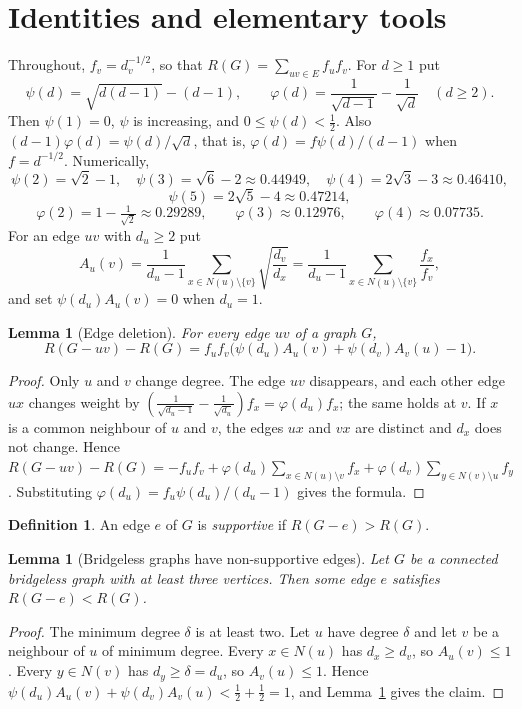 \documentclass[11pt,a4paper]{article}
\newtheorem{lemma}[theorem]{Lemma}
\theoremstyle{definition}
\newtheorem{definition}[theorem]{Definition}
\begin{document}
\section{Identities and elementary tools}\label{sec:tools}

Throughout, $f_v=d_v^{-1/2}$, so that $R(G)=\sum_{uv\in E}f_uf_v$. For $d\ge1$ put
\[
\psi(d)=\sqrt{d(d-1)}-(d-1),\qquad \varphi(d)=\frac1{\sqrt{d-1}}-\frac1{\sqrt d}\quad(d\ge2).
\]
Then $\psi(1)=0$, $\psi$ is increasing, and $0\le\psi(d)<\frac12$. Also $(d-1)\varphi(d)=\psi(d)/\sqrt d$, that is, $\varphi(d)=f\psi(d)/(d-1)$ when $f=d^{-1/2}$. Numerically,
\[
\psi(2)=\sqrt2-1,\quad \psi(3)=\sqrt6-2\approx0.44949,\quad\psi(4)=2\sqrt3-3\approx0.46410,
\]
\[
\psi(5)=2\sqrt5-4\approx0.47214,
\]
\[
\varphi(2)=1-\tfrac1{\sqrt2}\approx0.29289,\qquad\varphi(3)\approx0.12976,\qquad\varphi(4)\approx0.07735 .
\]
For an edge $uv$ with $d_u\ge2$ put
\[
A_u(v)=\frac1{d_u-1}\sum_{x\in N(u)\setminus\{v\}}\sqrt{\frac{d_v}{d_x}}=\frac1{d_u-1}\sum_{x\in N(u)\setminus\{v\}}\frac{f_x}{f_v},
\]
and set $\psi(d_u)A_u(v)=0$ when $d_u=1$.

\begin{lemma}[Edge deletion]\label{lem:edge}
For every edge $uv$ of a graph $G$,
\[
R(G-uv)-R(G)=f_uf_v\bigl(\psi(d_u)A_u(v)+\psi(d_v)A_v(u)-1\bigr).
\]
\end{lemma}
\begin{proof}
Only $u$ and $v$ change degree. The edge $uv$ disappears, and each other edge $ux$ changes weight by $(\frac1{\sqrt{d_u-1}}-\frac1{\sqrt{d_u}})f_x=\varphi(d_u)f_x$; the same holds at $v$. If $x$ is a common neighbour of $u$ and $v$, the edges $ux$ and $vx$ are distinct and $d_x$ does not change. Hence $R(G-uv)-R(G)=-f_uf_v+\varphi(d_u)\sum_{x\in N(u)\setminus v}f_x+\varphi(d_v)\sum_{y\in N(v)\setminus u}f_y$. Substituting $\varphi(d_u)=f_u\psi(d_u)/(d_u-1)$ gives the formula.
\end{proof}

\begin{definition}
An edge $e$ of $G$ is \emph{supportive} if $R(G-e)>R(G)$.
\end{definition}

\begin{lemma}[Bridgeless graphs have non-supportive edges]\label{lem:bridgeless}
Let $G$ be a connected bridgeless graph with at least three vertices. Then some edge $e$ satisfies $R(G-e)<R(G)$.
\end{lemma}
\begin{proof}
The minimum degree $\delta$ is at least two. Let $u$ have degree $\delta$ and let $v$ be a neighbour of $u$ of minimum degree. Every $x\in N(u)$ has $d_x\ge d_v$, so $A_u(v)\le1$. Every $y\in N(v)$ has $d_y\ge\delta=d_u$, so $A_v(u)\le1$. Hence $\psi(d_u)A_u(v)+\psi(d_v)A_v(u)<\frac12+\frac12=1$, and Lemma~\ref{lem:edge} gives the claim.
\end{proof}
\end{document}
